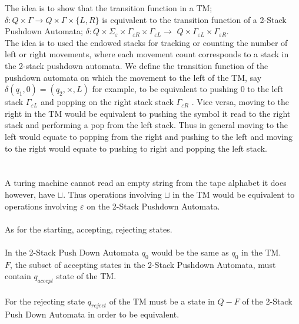 \documentclass{report}
\newcommand{\me}[1]{
\begin{math}
#1
\end{math}
}
\begin{document}
The idea is to show that the transition function in a TM; \me{\delta: Q \times \Gamma \to Q \times \Gamma \times  \{L,R\}} is equivalent to the transition function of a 2-Stack Pushdown Automata; \me{\delta: Q \times \Sigma_{\varepsilon} \times \Gamma_{\varepsilon R} \times \Gamma_{\varepsilon L}  \to } $Q \times \Gamma_{\varepsilon L}\times \Gamma_{\varepsilon R}$. \\

The idea is to used the endowed stacks for tracking or counting the number of left or right movements, where each movement count corresponds to a stack in the 2-stack pushdown automata.
We define the transition function of the pushdown automata on which the movement to the left of the TM, say \me{\delta(q_1,0) = (q_2,\times,L)} for example, to be equivalent to pushing 0 to the left stack \me{\Gamma_{\varepsilon L} } and popping on the right stack stack \me{\Gamma_{\varepsilon R} }. Vice versa, moving to the right in the TM would be equivalent to pushing the symbol it read to the right stack and performing a pop from the left stack. Thus in general moving to the left would equate to popping from the right and pushing to the left and moving to the right would equate to pushing to right and popping the left stack. 
\\ \\ \\
 A turing machine cannot read an empty string from the tape alphabet it does however, have $\sqcup$. Thus operations involving $\sqcup$ in the TM would be equivalent to operations involving $\varepsilon$ on the 2-Stack Pushdown Automata. \\ \\
As for the starting, accepting, rejecting states. \\ \\
In the 2-Stack Push Down Automata $q_0$ would be the same as $q_0 $ in the TM. \\
$F$, the subset of accepting states in the 2-Stack Pushdown Automata, must contain $q_{accept}$ state of the TM.\\ \\
For the rejecting state $q_{reject}$ of the TM must be a state in $Q - F$ of the 2-Stack Push Down Automata in order to be equivalent.
 
 
 
 \newpage
\end{document}
